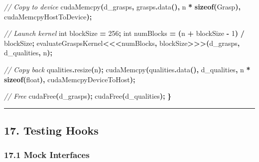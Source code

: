 \documentclass[
]{article}
\newenvironment{Shaded}{\begin{snugshade}}{\end{snugshade}}
\newcommand{\CommentTok}[1]{\textcolor[rgb]{0.56,0.35,0.01}{\textit{#1}}}
\newcommand{\DataTypeTok}[1]{\textcolor[rgb]{0.13,0.29,0.53}{#1}}
\newcommand{\DecValTok}[1]{\textcolor[rgb]{0.00,0.00,0.81}{#1}}
\newcommand{\KeywordTok}[1]{\textcolor[rgb]{0.13,0.29,0.53}{\textbf{#1}}}
\newcommand{\NormalTok}[1]{#1}
\newcommand{\OperatorTok}[1]{\textcolor[rgb]{0.81,0.36,0.00}{\textbf{#1}}}
\begin{document}
\begin{Shaded}
\begin{Highlighting}[]
    \CommentTok{// Copy to device}
\NormalTok{    cudaMemcpy}\OperatorTok{(}\NormalTok{d\_grasps}\OperatorTok{,}\NormalTok{ grasps}\OperatorTok{.}\NormalTok{data}\OperatorTok{(),}\NormalTok{ n }\OperatorTok{*} \KeywordTok{sizeof}\OperatorTok{(}\NormalTok{Grasp}\OperatorTok{),}\NormalTok{ cudaMemcpyHostToDevice}\OperatorTok{);}

    \CommentTok{// Launch kernel}
    \DataTypeTok{int}\NormalTok{ blockSize }\OperatorTok{=} \DecValTok{256}\OperatorTok{;}
    \DataTypeTok{int}\NormalTok{ numBlocks }\OperatorTok{=} \OperatorTok{(}\NormalTok{n }\OperatorTok{+}\NormalTok{ blockSize }\OperatorTok{{-}} \DecValTok{1}\OperatorTok{)} \OperatorTok{/}\NormalTok{ blockSize}\OperatorTok{;}
\NormalTok{    evaluateGraspsKernel}\OperatorTok{\textless{}\textless{}\textless{}}\NormalTok{numBlocks}\OperatorTok{,}\NormalTok{ blockSize}\OperatorTok{\textgreater{}\textgreater{}\textgreater{}(}\NormalTok{d\_grasps}\OperatorTok{,}\NormalTok{ d\_qualities}\OperatorTok{,}\NormalTok{ n}\OperatorTok{);}

    \CommentTok{// Copy back}
\NormalTok{    qualities}\OperatorTok{.}\NormalTok{resize}\OperatorTok{(}\NormalTok{n}\OperatorTok{);}
\NormalTok{    cudaMemcpy}\OperatorTok{(}\NormalTok{qualities}\OperatorTok{.}\NormalTok{data}\OperatorTok{(),}\NormalTok{ d\_qualities}\OperatorTok{,}\NormalTok{ n }\OperatorTok{*} \KeywordTok{sizeof}\OperatorTok{(}\DataTypeTok{float}\OperatorTok{),}\NormalTok{ cudaMemcpyDeviceToHost}\OperatorTok{);}

    \CommentTok{// Free}
\NormalTok{    cudaFree}\OperatorTok{(}\NormalTok{d\_grasps}\OperatorTok{);}
\NormalTok{    cudaFree}\OperatorTok{(}\NormalTok{d\_qualities}\OperatorTok{);}
\OperatorTok{\}}
\end{Highlighting}
\end{Shaded}

\begin{center}\rule{0.5\linewidth}{0.5pt}\end{center}

\hypertarget{testing-hooks}{%
\subsection{17. Testing Hooks}\label{testing-hooks}}

\hypertarget{mock-interfaces}{%
\subsubsection{17.1 Mock Interfaces}\label{mock-interfaces}}
\end{document}
